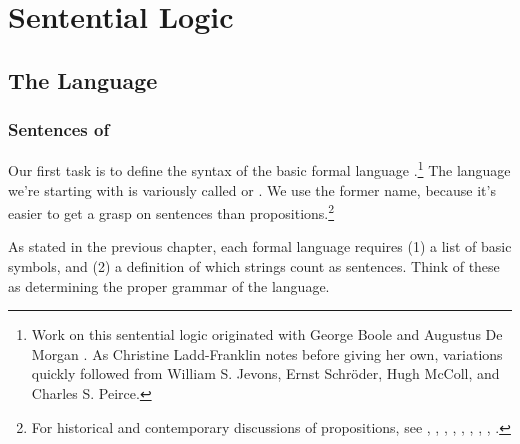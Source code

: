 
\chapter{Sentential Logic}\label{sententiallogic}


\section{The Language \GSL{}}\label{The Language GSL}

\subsection{Sentences of \GSL{}}\label{Sentences of GSL}
Our first task is to define the syntax of the basic formal language \GSL{}.\footnote{Work on this sentential logic originated with George Boole \citeyearpar{Boole1854} and Augustus De Morgan \citeyearpar{DeMorgan1847,DeMorgan1860}. 
	As Christine Ladd-Franklin notes \citeyearpar[17]{LaddFranklin1883} before giving her own, variations quickly followed from William S. Jevons, Ernst Schr\"oder, Hugh McColl, and Charles S. Peirce.} 
The language we're starting with is variously called  or . 
We use the former name, because it's easier to get a grasp on sentences than propositions.\footnote{For historical and contemporary discussions of propositions, see \citealt{Frege1892}, \citealt[13,47]{Russell1903}, \citealt[26]{Church1956}, \citealt[ch.~1]{Quine1986}, \citealt[ch.~3]{Schiffer1987}, \citealt{Grandy1993}, \citealt{Bealer1998b}, \citealp{King2007}, \citealt{Soames2010}.} 

As stated in the previous chapter, each formal language requires (1) a list of basic symbols, and (2) a definition of which strings count as sentences. Think of these as determining the proper grammar of the language. 

